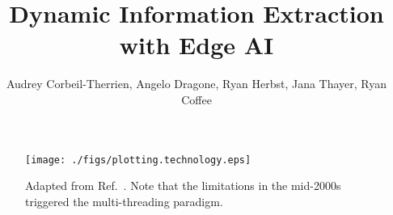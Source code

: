 \documentclass{article}
\title{Dynamic Information Extraction with Edge AI}%
\author{Audrey Corbeil-Therrien, Angelo Dragone, Ryan Herbst, Jana Thayer, Ryan Coffee}
\begin{document}
\maketitle



\begin{wrapfigure}[23]{r}{.4\linewidth}
	\vspace{-1.5\baselineskip}
	\centerline{ \texttt{[image: ./figs/plotting.technology.eps]} }
	\vspace{-1\baselineskip}
	\caption{
		\label{fig::technology} 
		Adapted from Ref.~\cite{MicroprocessorTrendData}. Note that the limitations in the mid-2000s triggered the multi-threading paradigm.
	}
\end{wrapfigure}
\end{document}
